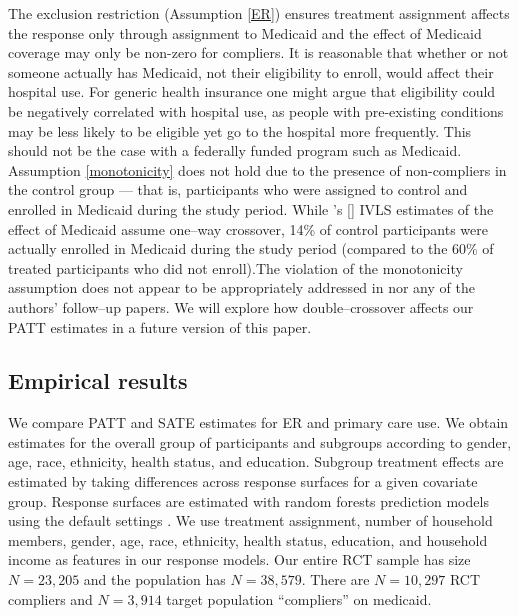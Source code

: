 \documentclass[12pt]{article}
\newcommand{\possessivecite}[1]{\citeauthor{#1}'s [\citeyear{#1}]}
\begin{document}
The exclusion restriction (Assumption \ref{ER}) ensures treatment assignment affects the response only through assignment to Medicaid  and the effect of Medicaid coverage may only be non-zero for compliers. It is reasonable that whether or not someone actually has Medicaid, not their eligibility to enroll, would affect their hospital use.  For generic health insurance one might argue that eligibility could be negatively correlated with hospital use, as people with pre-existing conditions may be less likely to be eligible yet go to the hospital more frequently.  This should not be the case with a federally funded program such as Medicaid. \\

Assumption \ref{monotonicity} does not hold due to the presence of non-compliers in the control group --- that is, participants who were assigned to control and enrolled in Medicaid during the study period. While \possessivecite{finkelstein2012} IVLS estimates of the effect of Medicaid assume one--way crossover, 14\% of control participants were actually enrolled in Medicaid during the study period (compared to the 60\% of treated participants who did not enroll).The violation of the monotonicity assumption does not appear to be appropriately addressed in \citet{finkelstein2012} nor any of the authors' follow--up papers. We will explore how double--crossover affects our PATT estimates in a future version of this paper. 

\subsection{Empirical results}

We compare PATT and SATE estimates for ER and primary care use. We obtain estimates for the overall group of participants and subgroups according to gender, age, race, ethnicity, health status, and education. Subgroup treatment effects are estimated by taking differences across response surfaces for a given covariate group. Response surfaces are estimated with random forests prediction models using the default settings \citep{breiman2001}. We use treatment assignment, number of household members, gender, age, race, ethnicity, health status, education, and household income as features in our response models. Our entire RCT sample has size $N=23,205$ and the population has $N=38,579$. There are $N=10,297$ RCT compliers and $N=3,914$ target population ``compliers'' on medicaid. \\
\end{document}

